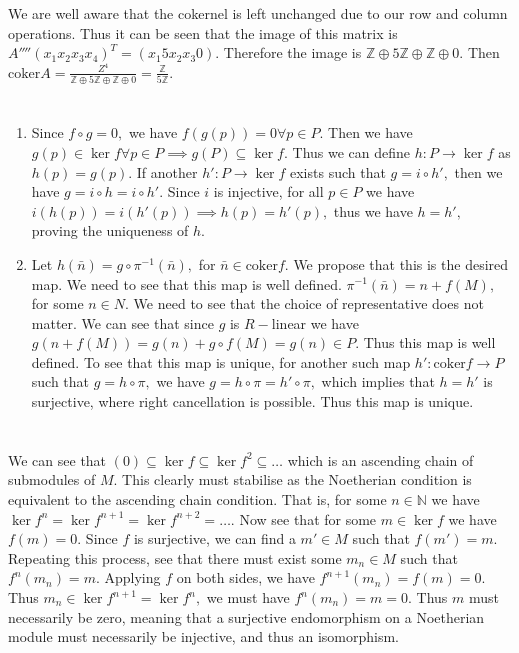 \documentclass{article}
\begin{document}
We are well aware that the cokernel is left unchanged due to our row and column operations. Thus it can be seen that the image of this matrix is $A''''(x_1 
x_2 x_3 x_4)^T=(x_1 5x_2 x_3 0).$ Therefore the image is $\mathbb{Z} \oplus 5\mathbb{Z} \oplus \mathbb{Z} \oplus 0.$ Then $\text{coker} 
A=\frac{Z^4}{\mathbb{Z} \oplus 5\mathbb{Z} \oplus \mathbb{Z} \oplus 0}= \frac{\mathbb{Z}}{5\mathbb{Z}}.$

\section{} %
\begin{enumerate}
	\item Since $f \circ g=0,$ we have $f(g(p))=0 \forall p \in P.$ Then we have $g(p) \in \ker f \forall p \in P \implies g(P) \subseteq \ker f.$ Thus we 
	can define $h: P \rightarrow \ker f$ as $h(p)=g(p).$ If another $h': P \rightarrow \ker f$ exists such that $g=i \circ h',$ then we have $g=i \circ h= i 
	\circ h'.$ Since $i$ is injective, for all $p \in P$ we have $i(h(p))=i(h'(p)) \implies h(p)=h'(p),$ thus we have $h=h',$ proving the uniqueness of $h.$
	
	\item Let $h(\bar{n})=g\circ \pi^{-1}(\bar{n}),$ for $\bar{n} \in \text{coker} f.$ We propose that this is the desired map. We need to see that this map 
	is well defined. $\pi^{-1}(\bar{n})= n + f(M),$ for some $n \in N.$ We need to see that the choice of representative does not matter. We can see that 
	since $g$ is $R-$linear we have $g(n + f(M))= g(n) + g \circ f(M)=g(n) \in P.$ Thus this map is well defined. To see that this map is unique, for 
	another such map $h': \text{coker} f \rightarrow P$ such that $ g=h \circ \pi,$ we have $g=h \circ \pi= h' \circ \pi,$ which implies that $h=h'$ is 
	surjective, where right cancellation is possible. Thus this map is unique. 
\end{enumerate}
\section{} %
We can see that $(0) \subseteq \ker f \subseteq \ker f^2 \subseteq \dots$ which is an ascending chain of submodules of $M.$ This clearly must stabilise as 
the Noetherian condition is equivalent to the ascending chain condition. That is, for some $n \in \mathbb{N}$ we have $\ker f^n=\ker f^{n+1}=\ker 
f^{n+2}=\dots.$ Now see that for some $m \in \ker f$ we have $f(m)=0.$ Since $f$ is surjective, we can find a $m' \in M$ such that $f(m')=m.$ Repeating this 
process, see that there must exist some $m_n \in M$ such that $f^n(m_n)=m.$ Applying $f$ on both sides, we have $f^{n+1}(m_n)=f(m)=0.$ Thus $m_n \in \ker 
f^{n+1}=\ker f^n,$ we must have $f^n(m_n)=m=0.$ Thus $m$ must necessarily be zero, meaning that a surjective endomorphism on a Noetherian module must 
necessarily be injective, and thus an isomorphism. 
\end{document}
